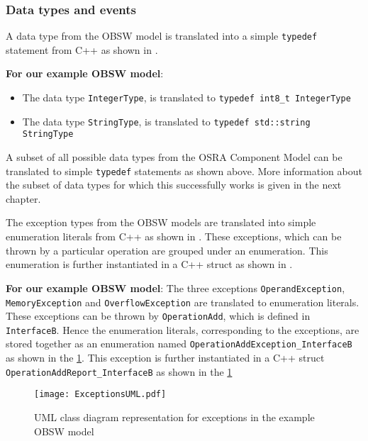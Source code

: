 \subsubsection{\textbf{Data types and events}}
A data type from the OBSW model is translated into a simple \texttt{typedef} statement from C++ as shown in \cite{MDSDBook}\cite{typedefRationale}.

\textbf{For our example OBSW model}:
\begin{itemize}
\item The data type \texttt{IntegerType}, is translated to \texttt{typedef\allowbreak \ int8\_t IntegerType}
\item The data type \texttt{StringType}, is translated to \texttt{typedef\allowbreak \ std::string StringType} 
\end{itemize}

A subset of all possible data types from the OSRA Component Model can be translated to simple \texttt{typedef} statements as shown above. More information about the subset of data types for which this successfully works is given in the next chapter. 

The exception types from the OBSW models are translated into simple enumeration literals from C++ as shown in \cite{ExceptionClasses}. These exceptions, which can be thrown by a particular operation are grouped under an enumeration. This enumeration is further instantiated in a C++ struct as shown in \cite{ExceptionClasses}.

\textbf{For our example OBSW model}: The three exceptions \texttt{Operand\allowbreak Exception}, \texttt{Memory\allowbreak Exception} and \texttt{Overflow\allowbreak Exception} are translated to enumeration literals. These exceptions can be thrown by \texttt{OperationAdd}, which is defined in \texttt{InterfaceB}. Hence the enumeration literals, corresponding to the exceptions, are stored together as an enumeration named \texttt{OperationAdd\allowbreak Exception\allowbreak\_InterfaceB} as shown in the \cref{fig: ExceptionsUML}. This exception is further instantiated in a C++ struct \texttt{OperationAdd\allowbreak Report\allowbreak\_InterfaceB} as shown in the \cref{fig: ExceptionsUML} 

\begin{figure}[h]
	\centering
	\texttt{[image: ExceptionsUML.pdf]}
	\caption{UML class diagram representation for exceptions in the example OBSW model}
	\label{fig: ExceptionsUML}
\end{figure}


